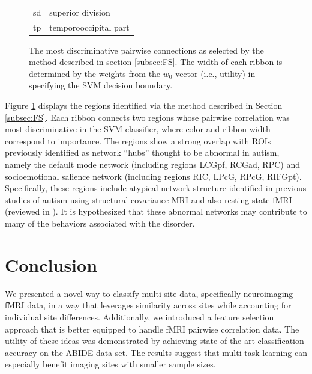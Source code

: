 \documentclass{llncs}
\begin{document}
\begin{figure}[htb]
\begin{minipage}[b]{.4\linewidth}
\begin{tabular}{l l}
sd & superior division\\
tp & temporooccipital part\\
\hline
\end{tabular}
\par\vspace{0pt}
\end{minipage}
\caption{The most discriminative pairwise connections as selected by the method described in section \ref{subsec:FS}.  The width of each ribbon is determined by the weights from the $w_0$ vector (i.e., utility) in  specifying the SVM decision boundary. }
\label{fig:circos}
\end{figure}



Figure \ref{fig:circos} displays the regions identified via the method described
in Section \ref{subsec:FS}.  Each ribbon connects two regions whose pairwise
correlation was most discriminative in the SVM classifier, where color and
ribbon width correspond to importance. The regions show a strong overlap with
ROIs previously identified as network ``hubs'' thought to be abnormal in autism,
namely the default mode network (including regions LCGpf, RCGad, RPC) and
socioemotional salience network (including regions RIC, LPcG, RPcG, RIFGpt).
Specifically, these regions include atypical network structure identified in
previous studies of autism using structural covariance MRI
\cite{zielinski2012scmri} and also resting state fMRI (reviewed in
\cite{jeff2014}). It is hypothesized that these abnormal networks may contribute
to many of the behaviors associated with the disorder.

\section{Conclusion}
We presented a novel way to classify multi-site data, specifically neuroimaging
fMRI data, in a way that leverages similarity across sites while accounting for
individual site differences.  Additionally, we introduced a feature selection
approach that is better equipped to handle fMRI pairwise correlation data.  The
utility of these ideas was demonstrated by achieving state-of-the-art
classification accuracy on the ABIDE data set. The results suggest that
multi-task learning can especially benefit imaging sites with smaller sample
sizes.


{}

\end{document}
